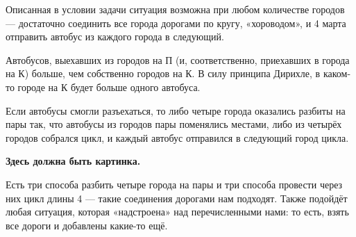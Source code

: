 \begin{itemize}

\itA Описанная в условии задачи ситуация возможна при любом количестве городов — достаточно соединить все города дорогами по кругу, «хороводом», и 4 марта отправить автобус из каждого города в следующий.

\itB Автобусов, выехавших из городов на П (и, соответственно, приехавших в города на К) больше, чем собственно городов на К. В силу принципа Дирихле, в каком-то городе на К будет больше одного автобуса.

\itC Если автобусы смогли разъехаться, то либо четыре города оказались разбиты на пары так, что автобусы из городов пары поменялись местами, либо из четырёх городов собрался цикл, и каждый автобус отправился в следующий город цикла.

{\bf Здесь должна быть картинка.}

Есть три способа разбить четыре города на пары и три способа провести через них цикл длины 4 — такие соединения дорогами нам подходят. Также подойдёт любая ситуация, которая «надстроена» над перечисленными нами: то есть, взять все дороги и добавлены какие-то ещё.
\end{itemize}